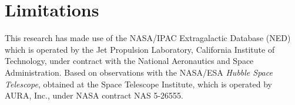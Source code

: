 \documentclass[iop]{emulateapj-rtx4}
\begin{document}
\section{Limitations}





This research has made use of the NASA/IPAC Extragalactic Database (NED) which is operated by the Jet Propulsion Laboratory, California Institute of Technology, under contract with the National Aeronautics and Space Administration. Based on observations with the NASA/ESA \textit{Hubble Space Telescope}, obtained at the Space Telescope Institute, which is operated by AURA, Inc., under NASA contract NAS 5-26555.




\end{document}

